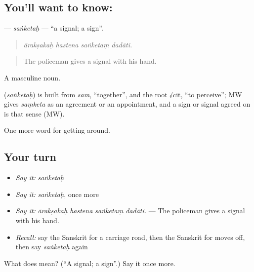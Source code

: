 \subsection*{You'll want to know: }
\textbf{} — \emph{saṅketaḥ} — \textquotedblleft{}a signal; a sign\textquotedblright{}.

\begin{quote}
   
\end{quote}

\begin{quote}
\emph{ārakṣakaḥ hastena saṅketaṃ dadāti.}
\end{quote}

\begin{quote}
The policeman gives a signal with his hand.
\end{quote}

A masculine noun.

\begin{cousinweb}
\textbf{} (\emph{saṅketaḥ}) is built from \emph{sam}, \textquotedblleft{}together\textquotedblright{}, and the root √cit, \textquotedblleft{}to perceive\textquotedblright{}; MW gives \emph{saṃketa} as an agreement or an appointment, and a sign or signal agreed on is that sense (MW).
\end{cousinweb}

\begin{grammarlens}[title={What you've built}]
One more word for getting around.
\end{grammarlens}

\subsection*{Your turn}
\begin{itemize}
\raggedright
  \item \emph{Say it:} \emph{saṅketaḥ}
  \item \emph{Say it:} \emph{saṅketaḥ}, once more
  \item \emph{Say it:} \emph{ārakṣakaḥ hastena saṅketaṃ dadāti.} — The policeman gives a signal with his hand.
  \item \emph{Recall:} say the Sanskrit for a carriage road, then the Sanskrit for moves off, then say \emph{saṅketaḥ} again
\end{itemize}

\begin{tcolorbox}[breakable,colback=teal!4,colframe=teal!35!black,title={Before you move on}]
What does  mean? (\textquotedblleft{}A signal; a sign\textquotedblright{}.) Say it once more.
\end{tcolorbox}
